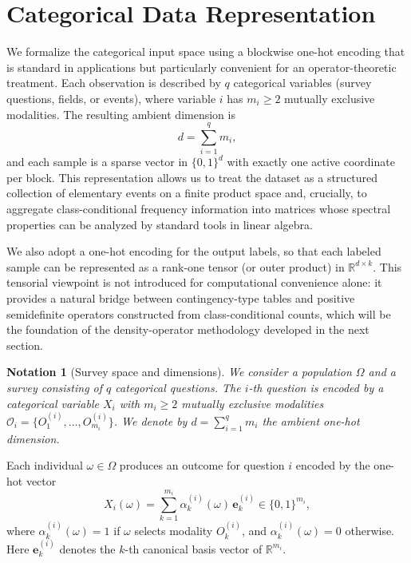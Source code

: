 \documentclass[preprint,11pt]{elsarticle}
\newtheorem{Notation}[Theorem]{Notation}
\newcommand{\R}{\mathbb{R}}
\begin{document}
\section{Categorical Data Representation}
\label{sec:categorical_rep}

We formalize the categorical input space using a blockwise one-hot encoding that is standard in applications but particularly convenient
for an operator-theoretic treatment. Each observation is described by $q$ categorical variables (survey questions, fields, or events), where
variable $i$ has $m_i\ge 2$ mutually exclusive modalities. The resulting ambient dimension is
\[
d=\sum_{i=1}^q m_i,
\]
and each sample is a sparse vector in $\{0,1\}^d$ with exactly one active coordinate per block. This representation allows us to treat the
dataset as a structured collection of elementary events on a finite product space and, crucially, to aggregate class-conditional frequency
information into matrices whose spectral properties can be analyzed by standard tools in linear algebra.

We also adopt a one-hot encoding for the output labels, so that each labeled sample can be represented as a rank-one tensor
(or outer product) in $\R^{d\times k}$. This tensorial viewpoint is not introduced for computational convenience alone: it provides a natural
bridge between contingency-type tables and positive semidefinite operators constructed from class-conditional counts, which will be the
foundation of the density-operator methodology developed in the next section.
\begin{Notation}[Survey space and dimensions]
We consider a population $\Omega$ and a survey consisting of $q$ categorical questions.
The $i$-th question is encoded by a categorical variable $X_i$ with $m_i\ge 2$ mutually exclusive modalities
$\mathcal O_i=\{O_1^{(i)},\dots,O_{m_i}^{(i)}\}$.
We denote by $d=\sum_{i=1}^q m_i$ the ambient one-hot dimension.
\end{Notation}

Each individual $\omega\in\Omega$ produces an outcome for question $i$ encoded by the one-hot vector
\[
X_i(\omega)=\sum_{k=1}^{m_i}\alpha_k^{(i)}(\omega)\, \mathbf e_k^{(i)}\in\{0,1\}^{m_i},
\]
where $\alpha_k^{(i)}(\omega)=1$ if $\omega$ selects modality $O_k^{(i)}$, and $\alpha_k^{(i)}(\omega)=0$ otherwise.
Here $\mathbf e_k^{(i)}$ denotes the $k$-th canonical basis vector of $\R^{m_i}$.
\end{document}
